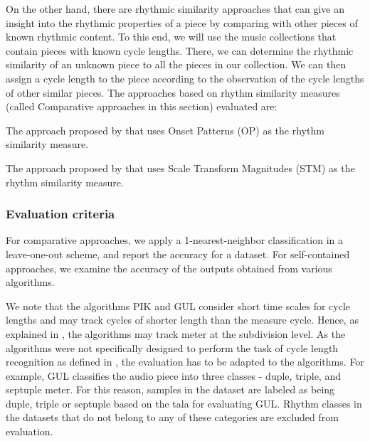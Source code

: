 On the other hand, there are rhythmic similarity approaches that can give an insight into the rhythmic properties of a piece by comparing with other pieces of known rhythmic content. To this end, we will use the music collections that contain pieces with known cycle lengths. There, we can determine the rhythmic similarity of an unknown piece to all the pieces in our collection. We can then assign a cycle length to the piece according to the observation of the cycle lengths of other similar pieces. The approaches based on rhythm similarity measures (called Comparative approaches in this section) evaluated are: 
\begin{description}[leftmargin=*]
  \item[\acrshort{OP} algorithm:]The approach proposed by  that uses Onset Patterns (OP) as the rhythm similarity measure.
	\item[\acrshort{STM} algorithm:]The approach proposed by  that uses Scale Transform Magnitudes (STM) as the rhythm similarity measure.
\end{description}

\subsubsection{Evaluation criteria} 
For comparative approaches, we apply a 1-nearest-neighbor classification in a leave-one-out scheme, and report the accuracy for a dataset. For self-contained approaches, we examine the accuracy of the outputs obtained from various algorithms. 

We note that the algorithms \acrshort{PIK} and \acrshort{GUL} consider short time scales for cycle lengths and may track cycles of shorter length than the measure cycle. Hence, as explained in , the algorithms may track meter at the subdivision level. As the algorithms were not specifically designed to perform the task of cycle length recognition as defined in , the evaluation has to be adapted to the algorithms. For example, \acrshort{GUL} classifies the audio piece into three classes - duple, triple, and septuple meter. For this reason, samples in the dataset are labeled as being duple, triple or septuple based on the \gls{tala} for evaluating \acrshort{GUL}. Rhythm classes in the datasets that do not belong to any of these categories are excluded from evaluation. 

